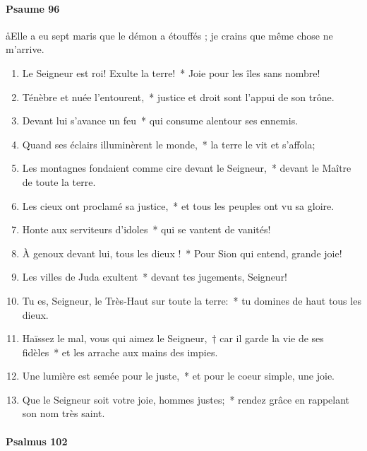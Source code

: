 \documentclass[twoside]{article}
\begin{document}
\begin{paracol}[1]{2}
\switchcolumn

\paragraph{Psaume 96}
\aa Elle a eu sept maris que le démon a étouffés ; je crains que même chose ne m’arrive.


\begin{enumerate}[wide, itemsep=0mm, labelwidth=!, labelindent=0pt, label=\color{gregoriocolor}\theenumi]
\item Le Seigneur est roi! Exulte la terre!~* Joie pour les îles sans nombre!
\item Ténèbre et nuée l'entourent,~* justice et droit sont l'appui de son trône.
\item Devant lui s'avance un feu~* qui consume alentour ses ennemis.
\item Quand ses éclairs illuminèrent le monde,~* la terre le vit et s'affola;
\item Les montagnes fondaient comme cire devant le Seigneur,~* devant le Maître de toute la terre.
\item Les cieux ont proclamé sa justice,~* et tous les peuples ont vu sa gloire.
\item Honte aux serviteurs d'idoles~* qui se vantent de vanités! 
\item À genoux devant lui, tous les dieux !~* Pour Sion qui entend, grande joie!
\item Les villes de Juda exultent~* devant tes jugements, Seigneur!
\item Tu es, Seigneur, le Très-Haut sur toute la terre:~* tu domines de haut tous les dieux.
\item Haïssez le mal, vous qui aimez le Seigneur,~† car il garde la vie de ses fidèles~* et les arrache aux mains des impies.
\item Une lumière est semée pour le juste,~* et pour le coeur simple, une joie.
\item Que le Seigneur soit votre joie, hommes justes;~* rendez grâce en rappelant son nom très saint.
\end{enumerate}

\switchcolumn*

\paragraph{Psalmus 102}



\end{paracol}
\end{document}
